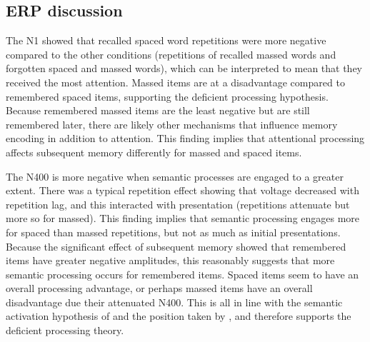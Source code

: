 
\subsection{ERP discussion}

The N1 showed that recalled spaced word repetitions were more negative compared to the other conditions (repetitions of recalled massed words and forgotten spaced and massed words), which can be interpreted to mean that they received the most attention.
Massed items are at a disadvantage compared to remembered spaced items, supporting the deficient processing hypothesis.  Because remembered massed items are the least negative but are still remembered later, there are likely other mechanisms that influence memory encoding in addition to attention.  This finding implies that attentional processing affects subsequent memory differently for massed and spaced items.


The N400 is more negative when semantic processes are engaged to a greater extent.  There was a typical repetition effect showing that voltage decreased with repetition lag, and this interacted with presentation (repetitions attenuate but more so for massed).  This finding implies that semantic processing engages more for spaced than massed repetitions, but not as much as initial presentations.
Because the significant effect of subsequent memory showed that remembered items have greater negative amplitudes, this reasonably suggests that more semantic processing occurs for remembered items.  Spaced items seem to have an overall processing advantage, or perhaps massed items have an overall disadvantage due their attenuated N400.  This is all in line with the semantic activation hypothesis of  and the position taken by , and therefore supports the deficient processing theory.


